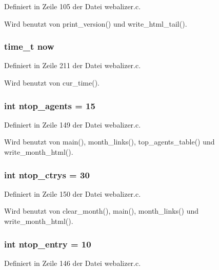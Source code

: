 Definiert in Zeile 105 der Datei webalizer.c.

Wird benutzt von print\_\-version() und write\_\-html\_\-tail().
\subsubsection{\setlength{\rightskip}{0pt plus 5cm}time\_\-t {\bf now}}\label{webalizer_8c_3c3ca8cc859a31aec6578f0dcf1b32a5}




Definiert in Zeile 211 der Datei webalizer.c.

Wird benutzt von cur\_\-time().
\subsubsection{\setlength{\rightskip}{0pt plus 5cm}int {\bf ntop\_\-agents} = 15}\label{webalizer_8c_09d5297ba12ba78e65bcb4679036de17}




Definiert in Zeile 149 der Datei webalizer.c.

Wird benutzt von main(), month\_\-links(), top\_\-agents\_\-table() und write\_\-month\_\-html().
\subsubsection{\setlength{\rightskip}{0pt plus 5cm}int {\bf ntop\_\-ctrys} = 30}\label{webalizer_8c_fcd390bd7df1e721799f33f0ac87fdaf}




Definiert in Zeile 150 der Datei webalizer.c.

Wird benutzt von clear\_\-month(), main(), month\_\-links() und write\_\-month\_\-html().
\subsubsection{\setlength{\rightskip}{0pt plus 5cm}int {\bf ntop\_\-entry} = 10}\label{webalizer_8c_a573c7e2a32733a06a3b0dbb9430569f}




Definiert in Zeile 146 der Datei webalizer.c.

